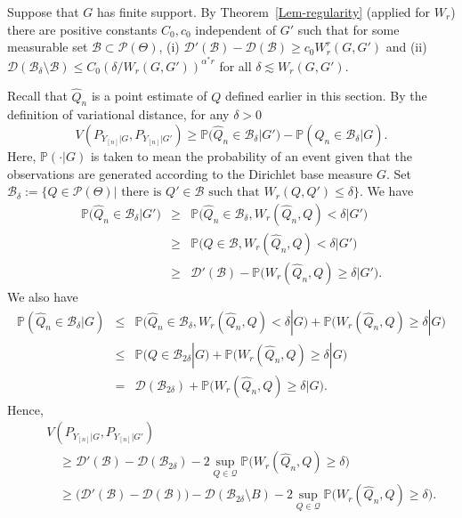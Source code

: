 \documentclass[MSNbibl,number,citesort]{arxbj}
\newcommand{\Dcal}{\mathcal{D}}
\newcommand{\Pcal}{\mathscr{P}}
\newcommand{\Qcal}{\mathcal{Q}}
\newcommand{\BB}{\mathscr{B}}
\newcommand{\Prob}{\mathbb{P}}
\newcommand{\Wr}{W_r}
\newcommand{\hatQ}{\hat{Q}}
\newcommand{\PG}{P_{Y_{[n]}|G}}
\begin{document}
\begin{pf}
Suppose that $G$ has finite support.
By Theorem~\ref{Lem-regularity} (applied for $\Wr$) there
are positive constants $C_0,c_0$ independent of $G'$ such that
for some measurable set $\BB\subset\Pcal(\Theta)$,
(i) $\Dcal'(\BB) - \Dcal(\BB) \geq c_0 \Wr^r(G,G')$ and
(ii) $\Dcal(\BB_\delta\setminus\BB) \leq C_0 (\delta/\Wr
(G,G'))^{{\alpha^*}r}$ for all
$\delta\lesssim\Wr(G,G')$.

Recall that $\hatQ_n$ is a point estimate of $Q$ defined earlier in this
section. By the definition of variational distance, for any $\delta> 0$
%
\[
V(\PG,P_{Y_{[n]}|G'}) \geq\Prob \bigl(\hatQ_n \in
\BB_{\delta} |G' \bigr) - \Prob(\hatQ_n \in
\BB_{\delta
} |G).
\]
%
Here, $\Prob(\cdot|G)$ is taken to mean the probability of an event
given that the
observations are generated according to the Dirichlet base measure $G$.
Set $\BB_\delta:= \{Q \in\Pcal(\Theta) | \mbox{ there is } Q' \in
\BB
\mbox{ such that }
\Wr(Q,Q') \leq\delta\}$. We have
%
\begin{eqnarray*}
\Prob \bigl(\hatQ_n \in\BB_{\delta} |G' \bigr)
& \geq& \Prob \bigl(\hatQ_n \in\BB_{\delta}, \Wr(
\hatQ_n,Q) < \delta|G' \bigr)
\\
& \geq& \Prob \bigl(Q \in\BB, \Wr(\hatQ_n,Q) < \delta|G'
\bigr)
\\
& \geq& \Dcal'(\BB) - \Prob \bigl(\Wr(\hatQ_n,Q) \geq
\delta|G' \bigr).
\end{eqnarray*}
%
We also have
%
\begin{eqnarray*}
\Prob(\hatQ_n \in\BB_{\delta} |G) & \leq& \Prob \bigl(
\hatQ_n \in\BB_{\delta}, \Wr(\hatQ_n,Q) < \delta|G
\bigr) + \Prob \bigl(\Wr(\hatQ_n,Q) \geq\delta| G \bigr)
\\
& \leq& \Prob(Q \in\BB_{2\delta}|G) + \Prob \bigl(\Wr(
\hatQ_n,Q) \geq\delta|G \bigr)
\\
& = & \Dcal(\BB_{2\delta}) + \Prob \bigl(\Wr(\hatQ_n,Q) \geq
\delta|G \bigr).
\end{eqnarray*}
%
Hence,
%
\begin{eqnarray*}
&&V(\PG,P_{Y_{[n]}|G'})\\
&&\quad  \geq \Dcal'(\BB) - \Dcal(
\BB_{2\delta}) - 2 \sup_{Q \in
\Qcal} \Prob \bigl(\Wr(
\hatQ_n,Q) \geq\delta \bigr)
\\
&&\quad \geq \bigl(\Dcal'(\BB)-\Dcal(\BB) \bigr) - \Dcal(
\BB_{2\delta}\setminus B) - 2\sup_{Q \in\Qcal} \Prob \bigl(\Wr(
\hatQ_n,Q) \geq\delta \bigr).
\end{eqnarray*}


\end{pf}
\end{document}
